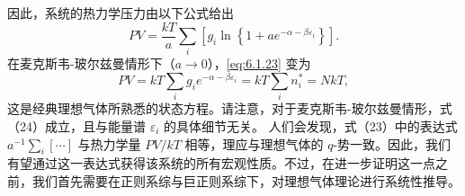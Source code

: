 因此，系统的热力学压力由以下公式给出
\begin{equation}\tag{6.1.22}\label{eq:6.1.22}
P V = \frac { k T } { a } \sum _ { i } \left[ g _ { i } \ln \left\{ 1 + a e ^{- \alpha - \beta \varepsilon _ { i} } \right\} \right] .
\end{equation}
在麦克斯韦-玻尔兹曼情形下（\(a \rightarrow 0\)），\autoref{eq:6.1.23} 变为
\begin{equation}\tag{6.1.23}\label{eq:6.1.23}
P V = k T \sum _ { i } g _ { i } e ^{- \alpha - \beta \varepsilon _ { i} } = k T \sum _ { i } n _ { i } ^{*} = N k T ,
\end{equation}
这是经典理想气体所熟悉的状态方程。请注意，对于麦克斯韦-玻尔兹曼情形，式（24）成立，且与能量谱 \(\varepsilon_{i}\) 的具体细节无关。
人们会发现，式（23）中的表达式 \(a^{-1}\sum_i[\cdots]\) 与热力学量 \(PV/kT\) 相等，理应与理想气体的 \(q\)-势一致。因此，我们有望通过这一表达式获得该系统的所有宏观性质。不过，在进一步证明这一点之前，我们首先需要在正则系综与巨正则系综下，对理想气体理论进行系统性推导。
